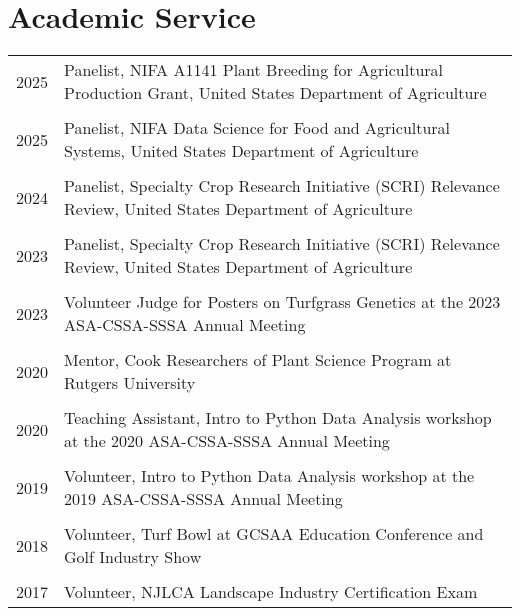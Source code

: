\documentclass[letterpaper,11pt, english]{article}
\begin{document}
\section{Academic Service}
\begin{flushleft}
  \begin{tabularx}{\textwidth}{@{}lX@{}}
      2025 \hspace{1cm} & Panelist, NIFA A1141 Plant Breeding for Agricultural Production Grant, United States Department of Agriculture  \\
      \\[-0.2cm] 
      2025 \hspace{1cm} & Panelist, NIFA Data Science for Food and Agricultural Systems, United States Department of Agriculture  \\
      \\[-0.2cm] 
      2024 \hspace{1cm} & Panelist, Specialty Crop Research Initiative (SCRI) Relevance Review, United States Department of Agriculture  \\
      \\[-0.2cm] 
      2023 \hspace{1cm} & Panelist, Specialty Crop Research Initiative (SCRI) Relevance Review, United States Department of Agriculture  \\
      \\[-0.2cm] 
      2023 \hspace{1cm} & Volunteer Judge for Posters on Turfgrass Genetics at the 2023 ASA-CSSA-SSSA Annual Meeting \\
      \\[-0.2cm] 
      2020 \hspace{1cm} & Mentor, Cook Researchers of Plant Science Program at Rutgers University \\
      \\[-0.2cm] 
      2020 \hspace{1cm} & Teaching Assistant, Intro to Python Data Analysis workshop at the 2020 ASA-CSSA-SSSA Annual Meeting \\
      \\[-0.2cm] 
      2019 \hspace{1cm} & Volunteer, Intro to Python Data Analysis workshop at the 2019 ASA-CSSA-SSSA Annual Meeting \\
      \\[-0.2cm] 
      2018 \hspace{1cm} & Volunteer, Turf Bowl at GCSAA Education Conference and Golf Industry Show \\
      \\[-0.2cm] 
      2017 \hspace{1cm} & Volunteer, NJLCA Landscape Industry Certification Exam \\
  \end{tabularx}
\end{flushleft}
\end{document}

